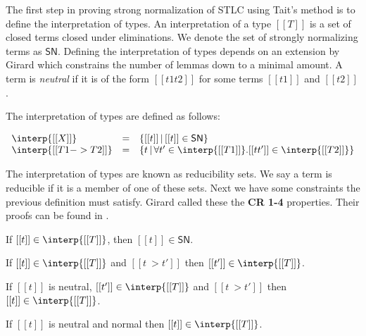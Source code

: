 The first step in proving strong normalization of STLC using Tait's
method is to define the interpretation of types.  An interpretation of
a type $[[T]]$ is a set of closed terms closed under eliminations.  We
denote the set of strongly normalizing terms as $\mathsf{SN}$.
Defining the interpretation of types depends on an extension by Girard
which constrains the number of lemmas down to a minimal amount.  A term
is \emph{neutral} if it is of the form $[[t1 t2]]$ for some terms
$[[t1]]$ and $[[t2]]$.  
\begin{definition}
  \label{def:stlc_interpretation_taits}
  The interpretation of types are defined as follows:
  \begin{center}
    \begin{math}
      \begin{array}{lll}
        \interp{[[X]]} & = & \{[[t]]\,|\, [[t]] \in \mathsf{SN} \}\\
        \interp{[[T1 -> T2]]} & = & \{ t\,|\,\forall t' \in \interp{[[T1]]}.
               [[t t']] \in \interp{[[T2]]} \}      
      \end{array}
    \end{math}
  \end{center}
\end{definition}
\noindent
The interpretation of types are known as reducibility sets.  We say a
term is reducible if it is a member of one of these sets.  Next we
have some constraints the previous definition must satisfy.  Girard
called these the \textbf{CR 1-4} properties.  Their proofs can be
found in \cite{Girard:1989}.
\begin{lemma}
  \label{lemma:stlc_sn_cr1}
  If $[[t]] \in \interp{[[T]]}$, then $[[t]] \in \mathsf{SN}$.
\end{lemma}

\begin{lemma}
  \label{lemma:stlc_sn_cr2}
  If $[[t]] \in \interp{[[T]]}$ and $[[t ~> t']]$ then $[[t']] \in \interp{[[T]]}$.
\end{lemma}

\begin{lemma}
  \label{lemma:stlc_sn_cr3}
  If $[[t]]$ is neutral, $[[t']] \in \interp{[[T]]}$ and $[[t ~> t']]$ then 
  $[[t]] \in \interp{[[T]]}$.
\end{lemma}

\begin{lemma}
  \label{lemma:stlc_sn_cr4}
  If $[[t]]$ is neutral and normal then $[[t]] \in \interp{[[T]]}$.
\end{lemma}

